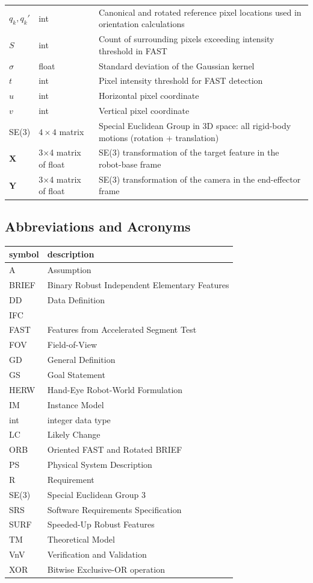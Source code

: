 \documentclass[12pt]{article}
\begin{document}
\begin{longtable*}{l l p{12cm}}
$q_k, q_k'$ & int & Canonical and rotated reference pixel locations used in orientation calculations \\
$S$ & int & Count of surrounding pixels exceeding intensity threshold in FAST \\
$\sigma$ & float & Standard deviation of the Gaussian kernel \\
$t$ & int & Pixel intensity threshold for FAST detection \\
$u$ & int & Horizontal pixel coordinate \\
$v$ & int & Vertical pixel coordinate \\
SE(3) & $4\times4$ matrix & Special Euclidean Group in 3D space: all rigid-body motions (rotation + translation) \\
$\textbf{X}$ & 3$\times$4 matrix of float & SE(3) transformation of the target feature in the robot-base frame \\
$\textbf{Y}$ & 3$\times$4 matrix of float & SE(3) transformation of the camera in the end-effector frame \\
\bottomrule
\end{longtable*}


\subsection{Abbreviations and Acronyms}

\renewcommand{\arraystretch}{1.2}
\begin{tabular}{l l} 
  \toprule		
  \textbf{symbol} & \textbf{description}\\
  \midrule 
  A & Assumption\\
  BRIEF & Binary Robust Independent Elementary Features\\ 
  DD & Data Definition\\
  IFC & \progname{}\\
  FAST & Features from Accelerated Segment Test\\
  FOV & Field-of-View\\
  GD & General Definition\\
  GS & Goal Statement\\
  HERW  & Hand-Eye Robot-World Formulation \\
  IM & Instance Model\\
  int & integer data type \\
  LC & Likely Change\\
  ORB & Oriented FAST and Rotated BRIEF\\
  PS & Physical System Description\\
  R & Requirement\\
  SE(3) & Special Euclidean Group 3\\
  SRS & Software Requirements Specification\\
  SURF & Speeded-Up Robust Features\\
  TM & Theoretical Model\\
  VnV & Verification and Validation\\
  XOR & Bitwise Exclusive-OR operation\\
  \bottomrule
\end{tabular}\\
\end{document}
